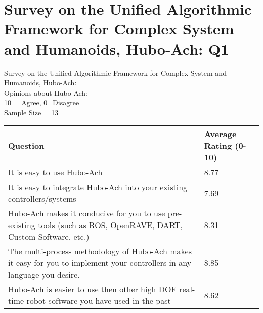 \chapter{Survey on the Unified Algorithmic Framework for Complex System and Humanoids, Hubo-Ach: Q1}\label{abs:q1}
\Large
\centering
Survey on the Unified Algorithmic Framework for Complex System and Humanoids, Hubo-Ach:\\
Opinions about Hubo-Ach:\\
\small
10 = Agree, 0=Disagree\\
Sample Size = 13\\
\normalsize
\begin{longtable}{|p{9cm} | p{3cm} | }
\hline
Question	&	Average Rating (0-10)	\\	\hline
\hline
\hline
It is easy to use Hubo-Ach													& 8.77\\
\hline
It is easy to integrate Hubo-Ach into your existing controllers/systems 							& 7.69\\
\hline
Hubo-Ach makes it conducive for you to use pre-existing tools (such as ROS, OpenRAVE, DART, Custom Software, etc.)		& 8.31\\
\hline
The multi-process methodology of Hubo-Ach makes it easy for you to implement your controllers in any language you desire.	& 8.85\\
\hline
Hubo-Ach is easier to use then other high DOF real-time robot software you have used in the past				& 8.62\\
\hline

\end{longtable}

